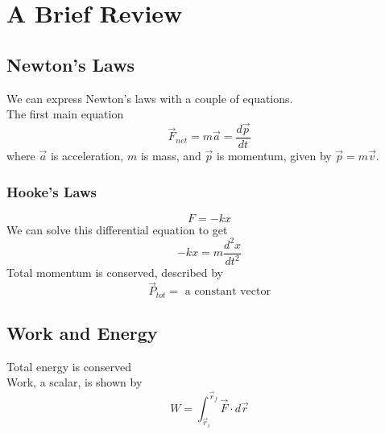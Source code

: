 \chapter{A Brief Review}
\section{Newton's Laws}
We can express Newton's laws with a couple of equations. \\
The first main equation
\[ \vec{F}_{net} = m \vec{a} = \dfrac{d \vec{p}}{dt} \]
where $ \vec{a} $ is acceleration, $ m $ is mass, and $ \vec{p} $ is momentum, given by $ \vec{p} = m \vec{v} $. 
\subsection*{Hooke's Laws}
\[ F = -kx \]
We can solve this differential equation to get 
\[ -kx = m \dfrac{d^2 x}{dt^2} \]
Total momentum is conserved, described by 
\[ \vec{P}_{tot} = \mbox{ a constant vector} \]
\section{Work and Energy}
Total energy is conserved \\ 
Work, a scalar, is shown by
\[ W = \int_{\vec{r}_i}^{\vec{r}_f} \vec{F} \cdot d \vec{r} \]